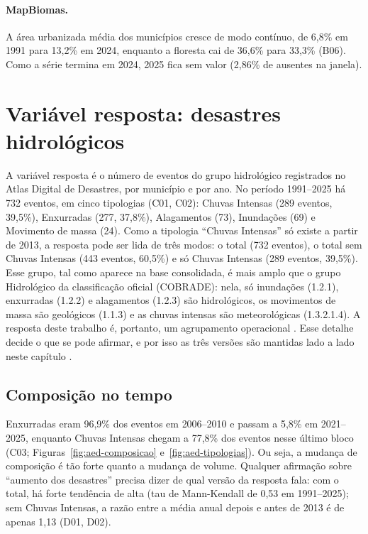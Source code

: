 \paragraph{MapBiomas.} A área urbanizada média dos municípios cresce de modo contínuo, de 6,8\% em 1991 para 13,2\% em 2024, enquanto a floresta cai de 36,6\% para 33,3\% (B06). Como a série termina em 2024, 2025 fica sem valor (2,86\% de ausentes na janela).

\section{Variável resposta: desastres hidrológicos}
\label{sec:aed-resposta}

A variável resposta é o número de eventos do grupo hidrológico registrados no Atlas Digital de Desastres, por município e por ano. No período 1991--2025 há 732 eventos, em cinco tipologias (C01, C02): Chuvas Intensas (289 eventos, 39,5\%), Enxurradas (277, 37,8\%), Alagamentos (73), Inundações (69) e Movimento de massa (24). Como a tipologia ``Chuvas Intensas'' só existe a partir de 2013, a resposta pode ser lida de três modos: o total (732 eventos), o total sem Chuvas Intensas (443 eventos, 60,5\%) e só Chuvas Intensas (289 eventos, 39,5\%). Esse grupo, tal como aparece na base consolidada, é mais amplo que o grupo Hidrológico da classificação oficial (COBRADE): nela, só inundações (1.2.1), enxurradas (1.2.2) e alagamentos (1.2.3) são hidrológicos, os movimentos de massa são geológicos (1.1.3) e as chuvas intensas são meteorológicas (1.3.2.1.4). A resposta deste trabalho é, portanto, um agrupamento operacional . Esse detalhe decide o que se pode afirmar, e por isso as três versões são mantidas lado a lado neste capítulo .

\subsection{Composição no tempo}

Enxurradas eram 96,9\% dos eventos em 2006--2010 e passam a 5,8\% em 2021--2025, enquanto Chuvas Intensas chegam a 77,8\% dos eventos nesse último bloco (C03; Figuras~\ref{fig:aed-composicao} e~\ref{fig:aed-tipologias}). Ou seja, a mudança de composição é tão forte quanto a mudança de volume. Qualquer afirmação sobre ``aumento dos desastres'' precisa dizer de qual versão da resposta fala: com o total, há forte tendência de alta (tau de Mann-Kendall de 0,53 em 1991--2025); sem Chuvas Intensas, a razão entre a média anual depois e antes de 2013 é de apenas 1,13 (D01, D02).

